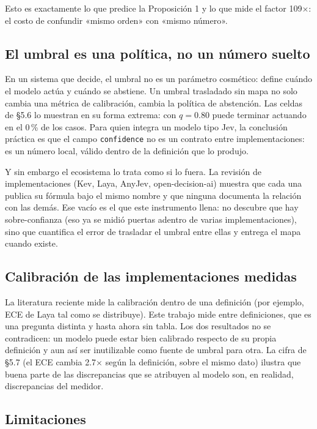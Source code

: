 Esto es exactamente lo que predice la Proposición 1 y lo que mide el factor 109$\times$: el costo de confundir «mismo orden» con «mismo número».

\subsection{El umbral es una política, no un número suelto}

En un sistema que decide, el umbral no es un parámetro cosmético: define cuándo el modelo actúa y cuándo se abstiene. Un umbral trasladado sin mapa no solo cambia una métrica de calibración, cambia la política de abstención. Las celdas de \S5.6 lo muestran en su forma extrema: con $q=0.80$ puede terminar actuando en el 0\,\% de los casos. Para quien integra un modelo tipo Jev, la conclusión práctica es que el campo \texttt{confidence} no es un contrato entre implementaciones: es un número local, válido dentro de la definición que lo produjo.

Y sin embargo el ecosistema lo trata como si lo fuera. La revisión de implementaciones (Kev, Laya, AnyJev, open-decision-ai) muestra que cada una publica su fórmula bajo el mismo nombre y que ninguna documenta la relación con las demás. Ese vacío es el que este instrumento llena: no descubre que hay sobre-confianza (eso ya se midió puertas adentro de varias implementaciones), sino que cuantifica el error de trasladar el umbral entre ellas y entrega el mapa cuando existe.

\subsection{Calibración de las implementaciones medidas}

La literatura reciente mide la calibración dentro de una definición (por ejemplo, ECE de Laya tal como se distribuye). Este trabajo mide entre definiciones, que es una pregunta distinta y hasta ahora sin tabla. Los dos resultados no se contradicen: un modelo puede estar bien calibrado respecto de su propia definición y aun así ser inutilizable como fuente de umbral para otra. La cifra de \S5.7 (el ECE cambia 2.7$\times$ según la definición, sobre el mismo dato) ilustra que buena parte de las discrepancias que se atribuyen al modelo son, en realidad, discrepancias del medidor.

\subsection{Limitaciones}

